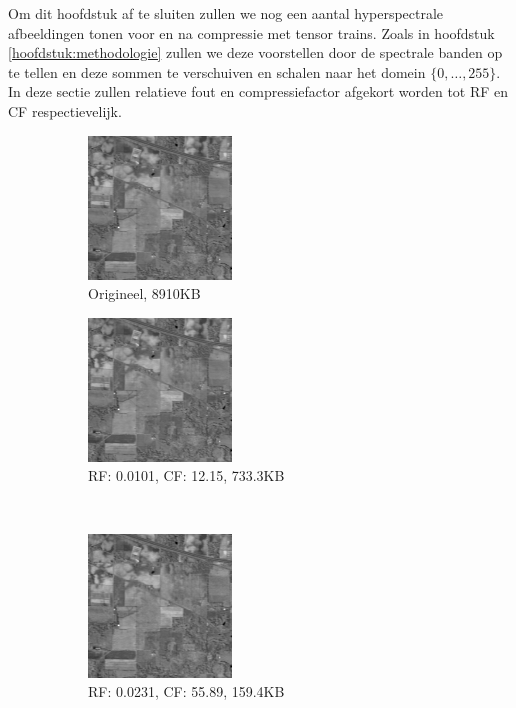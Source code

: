Om dit hoofdstuk af te sluiten zullen we nog een aantal hyperspectrale afbeeldingen tonen voor en na compressie met tensor trains. Zoals in hoofdstuk \ref{hoofdstuk:methodologie} zullen we deze voorstellen door de spectrale banden op te tellen en deze sommen te verschuiven en schalen naar het domein $\{0, \dots, 255\}$. In deze sectie zullen relatieve fout en compressiefactor afgekort worden tot RF en CF respectievelijk.

\newpage
\begin{figure}[]
\centering
\begin{subfigure}{0.48\textwidth}
  \centering
  \includegraphics[scale=1]{images/indian_pines_cropped_sum.png}
  \caption{Origineel, 8910KB}
\end{subfigure}
\begin{subfigure}{0.48\textwidth}
  \centering
  \includegraphics[scale=1]{images/example_compression_Indian_Pines_0_01.png}
  \caption{RF: 0.0101, CF: 12.15, 733.3KB}
\end{subfigure}
\\
\begin{subfigure}{0.48\textwidth}
  \centering
  \includegraphics[scale=1]{images/example_compression_Indian_Pines_0_025.png}
  \caption{RF: 0.0231, CF: 55.89, 159.4KB}
\end{subfigure}
\begin{subfigure}{0.48\textwidth}

\end{subfigure}
\end{figure}
